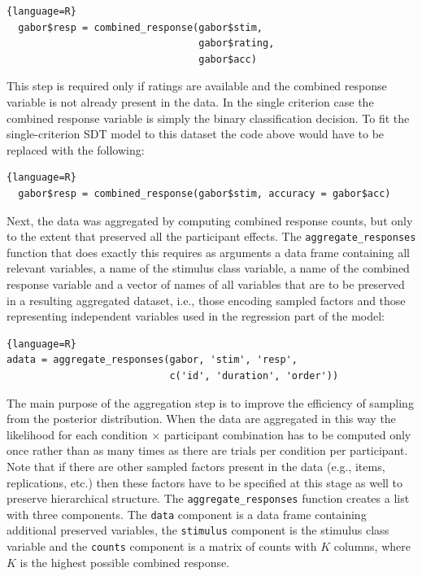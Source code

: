 \documentclass[oneside,a4paper]{article}
\begin{document}
\begin{lstlisting}{language=R}
  gabor$resp = combined_response(gabor$stim, 
                                 gabor$rating, 
                                 gabor$acc)
\end{lstlisting}

This step is required only if ratings are available and the combined
response variable is not already present in the data. In the single
criterion case the combined response variable is simply the binary
classification decision. To fit the single-criterion SDT model to this
dataset the code above would have to be replaced with the following:

\begin{lstlisting}{language=R}
  gabor$resp = combined_response(gabor$stim, accuracy = gabor$acc)
\end{lstlisting}

Next, the data was aggregated by computing combined response counts,
but only to the extent that preserved all the participant effects. The
\texttt{aggregate\_responses} function that does exactly this requires
as arguments a data frame containing all relevant variables, a name of
the stimulus class variable, a name of the combined response variable
and a vector of names of all variables that are to be preserved in a
resulting aggregated dataset, i.e., those encoding sampled factors and
those representing independent variables used in the regression part
of the model:

\begin{lstlisting}{language=R}
adata = aggregate_responses(gabor, 'stim', 'resp', 
                            c('id', 'duration', 'order'))  
\end{lstlisting}

The main purpose of the aggregation step is to improve the efficiency
of sampling from the posterior distribution. When the data are
aggregated in this way the likelihood for each condition $\times$
participant combination has to be computed only once rather than as
many times as there are trials per condition per participant. Note
that if there are other sampled factors present in the data (e.g.,
items, replications, etc.) then these factors have to be specified at
this stage as well to preserve hierarchical structure. The
\texttt{aggregate\_responses} function creates a list with three
components. The \texttt{data} component is a data frame containing
additional preserved variables, the \texttt{stimulus} component is the
stimulus class variable and the \texttt{counts} component is a matrix
of counts with $K$ columns, where $K$ is the highest possible combined
response.
\end{document}

